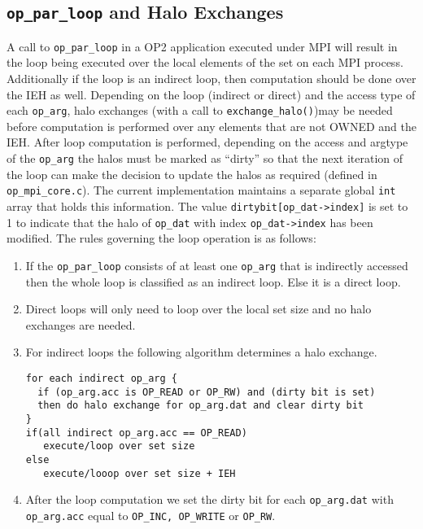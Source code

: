 \documentclass[12pt]{article}
\begin{document}
\subsection{\texttt{op\_par\_loop} and Halo Exchanges}\label{subsec/exchange}
A call to \texttt{op\_par\_loop} in a OP2 application executed under MPI will result in the loop being executed over
the local elements of the set on each MPI process. Additionally if the loop is an indirect loop, then computation
should be done over the IEH as well. Depending on the loop (indirect or direct) and the access type of each
\texttt{op\_arg}, halo exchanges (with a call to \texttt{exchange\_halo()})may be needed before computation is performed
over any elements that are not OWNED and the IEH.
After loop computation is performed, depending on the access and argtype of the \texttt{op\_arg} the halos must be
marked as ``dirty'' so that the next iteration of the loop can make the decision to update the halos as required
(defined in \texttt{op\_mpi\_core.c}). The current implementation maintains a separate global \texttt{int} array that
holds this information. The value \texttt{dirtybit[op\_dat->index]} is set to 1 to indicate that the halo of
\texttt{op\_dat} with index \texttt{op\_dat->index} has been modified. The rules governing the loop operation
is as follows: 
\begin{enumerate}
\item If the \texttt{op\_par\_loop} consists of at least one \texttt{op\_arg} that is indirectly accessed then the
whole loop is classified as an indirect loop. Else it is a direct loop. 

\item Direct loops will only need to loop over the local set size and no halo exchanges are needed. 

\item For indirect loops the following algorithm determines a halo exchange.
\begin{verbatim}
for each indirect op_arg {
  if (op_arg.acc is OP_READ or OP_RW) and (dirty bit is set)
  then do halo exchange for op_arg.dat and clear dirty bit
}
if(all indirect op_arg.acc == OP_READ)
   execute/loop over set size 
else
   execute/looop over set size + IEH
\end{verbatim}
\item After the loop computation we set the dirty bit for each \texttt{op\_arg.dat} with \texttt{op\_arg.acc} equal to
\texttt{OP\_INC, OP\_WRITE} or \texttt{OP\_RW}. 
\end{enumerate}
\end{document}
